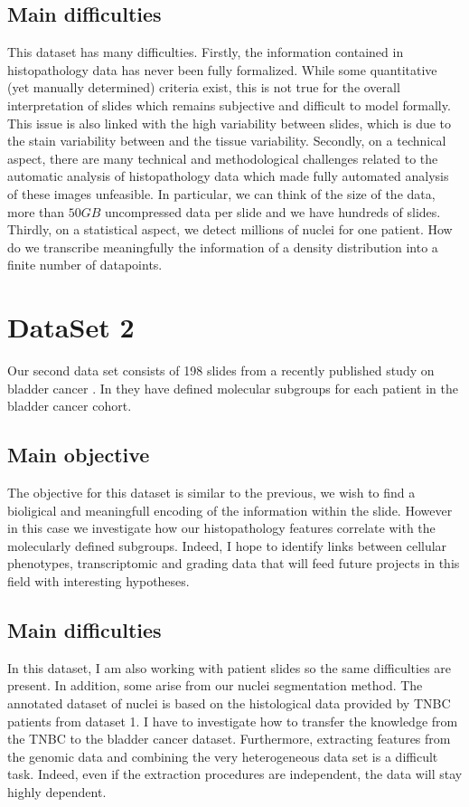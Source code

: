 \documentclass[a4paper,10pt,twocolumn]{article}
\begin{document}
\subsection{Main difficulties}
This dataset has many difficulties. Firstly, the information
contained in histopathology data has never been fully
formalized. While some quantitative (yet manually determined) criteria
exist, this is not true for the overall interpretation of slides
which remains subjective and difficult to model formally. This issue is also linked with the high variability 
between slides, which is due to the stain variability between and the tissue variability. 
Secondly, on a technical aspect, there are many technical and methodological challenges related
  to the automatic analysis of histopathology data which made fully
  automated analysis of these images unfeasible. In particular, we can
  think of the size of the data, more than $50GB$ uncompressed data
  per slide and we have hundreds of slides. 
  Thirdly, on a statistical aspect, we detect millions of nuclei for one patient. How do we transcribe meaningfully the information of a density distribution into a finite number of datapoints.
  
\section{DataSet 2}

Our second data set consists of 198 slides from a recently published study on bladder cancer
\citep{biton2014independent}. In \citep{biton2014independent} they have defined molecular subgroups for each patient in the bladder cancer cohort. 

\subsection{Main objective}
The objective for this dataset is similar to the previous, we wish to find a bioligical and meaningfull 
encoding of the information within the slide. However in this case we investigate how 
our histopathology features correlate with the
molecularly defined subgroups. Indeed, I hope to identify links between
cellular phenotypes, transcriptomic and grading data that will feed
future projects in this field with interesting hypotheses.


\subsection{Main difficulties}
In this dataset, I am also working with patient slides so the same difficulties are present. In addition, some arise from our nuclei segmentation method. The annotated dataset of nuclei is based on the histological data provided by TNBC patients from dataset 1. I have to investigate how to transfer the knowledge from the TNBC to the bladder cancer dataset. 
Furthermore, extracting features
from the genomic data and combining the very heterogeneous data set is
a difficult task. Indeed, even if the extraction procedures are
independent, the data will stay highly dependent. 
\end{document}

